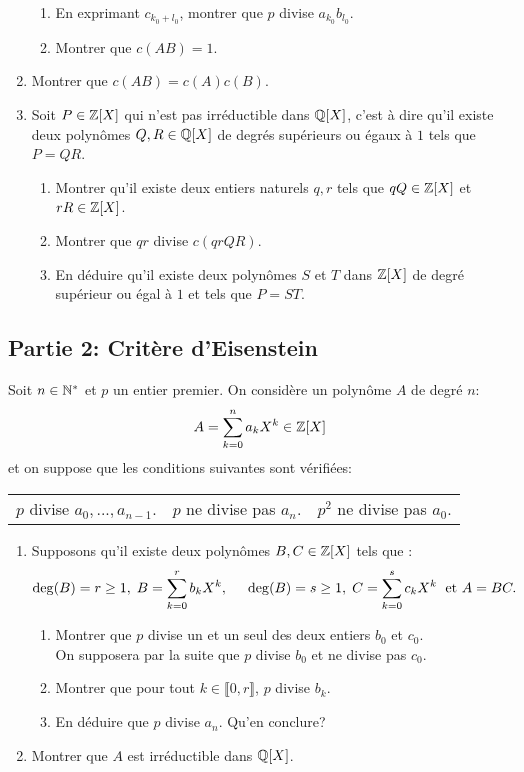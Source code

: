 \begin{enumerate}
\begin{enumerate}
  \item En exprimant $c_{k_{0}+l_{0}}$, montrer que $p$ divise $a_{k_{0}}b_{l_{0}}$. 
  \item Montrer que $c(AB) = 1$. 
 \end{enumerate}
 
 \item   Montrer que $c(AB) = c(A)c(B)$.
  
\item  Soit $P\in \mathbb{Z}[X]$ qui n'est pas irréductible dans $\mathbb{Q}[X]$, c'est à dire qu'il existe deux polynômes $Q,R\in \mathbb{Q}[X]$ de degrés supérieurs ou égaux à $1$ tels 
que $P = QR$. 
 \begin{enumerate}
           \item Montrer qu'il existe deux entiers naturels $q,r$ tels que $qQ\in \mathbb{Z}[X]$ et $rR\in \mathbb{Z}[X]$. 
           \item Montrer que $qr$ divise $c(qrQR)$. 
          \item En déduire qu'il existe deux polynômes $S$ et $T$ dans $\mathbb{Z}[X]$ de degré supérieur ou égal à $1$ et tels que $P = ST$. 
 \end{enumerate}
\end{enumerate}         

\subsection*{Partie 2: Critère d'Eisenstein}
Soit $n\in \mathbb{N}^*$ et $p$ un entier premier. On considère un polynôme $A$ de degré $n$: 
\[
 A = \sum_{k=0}^{n}a_{k}X^{k}\in \mathbb{Z}[X]
\]
et on suppose que les conditions suivantes sont vérifiées:
\begin{center}
\begin{tabular}{lll}
$p$ divise $a_{0},...,a_{n-1}$. & $p$ ne divise pas $a_{n}$. & $p^{2}$ ne divise pas $a_{0}$.\\
\end{tabular}
\end{center}
\begin{enumerate}
\item  Supposons qu'il existe deux polynômes $B,C\in \mathbb{Z}[X]$ tels que :
\begin{displaymath}
\deg(B) = r \geq1,\; B = \sum_{k=0}^{r}b_{k}X^{k}, \hspace{0.5cm}
\deg(B) = s \geq 1, \;C = \sum_{k=0}^{s}c_{k}X^{k}\;
\text{ et } A = BC.
\end{displaymath}

\begin{enumerate}
 \item Montrer que $p$ divise un et un seul des deux entiers $b_{0}$ et $c_{0}$. \\
 On supposera par la suite que $p$ divise $b_{0}$ et ne divise pas $c_{0}$.
 \item Montrer que pour tout $k\in \llbracket 0, r\rrbracket$, $p$ divise $b_{k}$.
 \item En déduire que $p$ divise $a_{n}$. Qu'en conclure?
\end{enumerate}

\item  Montrer que $A$ est irréductible dans $\mathbb{Q}[X]$. 
\end{enumerate}

